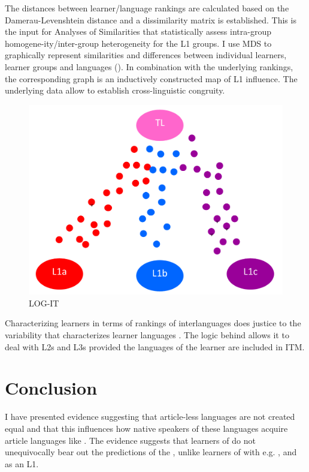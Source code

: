 \documentclass[output=paper,
modfonts
]{langscibook}
\begin{document}
The distances between learner/language rankings are calculated based on the Damerau-Levenshtein distance and a dissimilarity matrix is established. This is the input for Analyses of Similarities that statistically assess intra-group homogene\hyp{}ity/inter-group heterogeneity for the L1 groups. I use MDS to graphically represent similarities and differences between individual learners, learner groups and languages (). In combination with the underlying rankings, the corresponding graph is an inductively constructed map of L1 influence. The underlying data allow to establish cross-linguistic congruity. 

\begin{figure}
\includegraphics[height=.3\textheight]{figures/LOG-IT.png}
\caption{LOG-IT}
\label{fig:lebruyn:5}
\end{figure}

Characterizing learners in terms of rankings of interlanguages does justice to the variability that characterizes learner languages \citep{LarsenFreeman2006,deBotetal2007}. The logic behind  allows it to deal with L2s and L3s provided the languages of the learner are included in ITM.

\section{Conclusion}
\label{lebruyn:6:conclusion}

I have presented evidence suggesting that article-less languages are not created equal and that this influences how native speakers of these languages acquire article languages like . The evidence suggests that  learners of  do not unequivocally bear out the predictions of the , unlike learners of  with e.g. ,  and  as an L1. 
\end{document}
